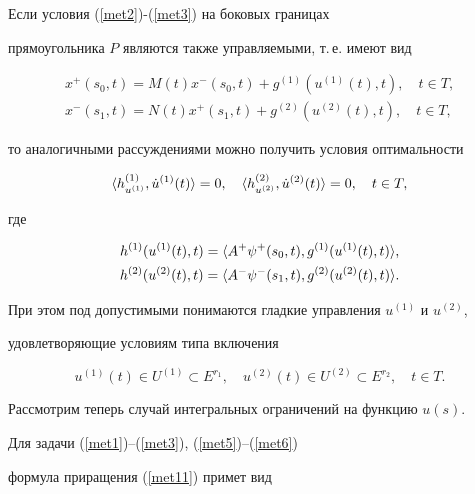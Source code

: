 \begin{notenonum}


Если условия (\ref{met2})-(\ref{met3}) на боковых границах 


прямоугольника $P$ являются также управляемыми, т.\,е. имеют вид


\begin{gather*}


x^+(s_0,t)=M(t) x^-(s_0,t)+g^{(1)}(u^{(1)}(t),t),\quad  t\in T,\\


x^-(s_1,t)=N(t) x^+(s_1,t)+g^{(2)}(u^{(2)}(t),t),\quad  t\in T,


\end{gather*}


то аналогичными рассуждениями можно получить условия оптимальности


$$


\la h^{(1)}_{u^{(1)}}, \Dot{u}^{(1)} (t)\ra=0,\quad


\la h^{(2)}_{u^{(2)}}, \Dot{u}^{(2)} (t)\ra=0, \quad t\in T,


$$


где


\begin{gather*}


h^{(1)}(u^{(1)}(t),t)=\la A^+\psi^+(s_0,t),g^{(1)}(u^{(1)}(t),t)\ra,\\


h^{(2)}(u^{(2)}(t),t)=\la A^-\psi^-(s_1,t),g^{(2)}(u^{(2)}(t),t)\ra.


\end{gather*}


При этом под допустимыми понимаются гладкие управления $u^{(1)}$ и $u^{(2)}$,


удовлетворяющие условиям типа включения


$$


u^{(1)}(t)\in U^{(1)}\subset E^{r_1},\quad u^{(2)}(t)\in U^{(2)}


\subset E^{r_2},\quad t\in T.


$$


\end{notenonum}





Рассмотрим теперь случай интегральных ограничений на функцию $u(s)$.


Для задачи (\ref{met1})--(\ref{met3}), (\ref{met5})--(\ref{met6})


формула приращения (\ref{met11}) примет вид


